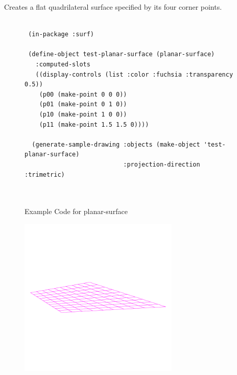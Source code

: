 \documentclass [11pt]{book}
\begin{document}
\begin{itemize}
\begin{description}
Creates a flat quadrilateral surface specified by its four corner points.



\end{description}




\begin{figure}
\begin{lrbox}{\boxedverb}
\begin{minipage}{\linewidth}
{\small

\begin{verbatim}

 (in-package :surf)

 (define-object test-planar-surface (planar-surface)
   :computed-slots
   ((display-controls (list :color :fuchsia :transparency 0.5))
    (p00 (make-point 0 0 0))
    (p01 (make-point 0 1 0))
    (p10 (make-point 1 0 0))
    (p11 (make-point 1.5 1.5 0))))

  (generate-sample-drawing :objects (make-object 'test-planar-surface)
                           :projection-direction :trimetric)



\end{verbatim}}
\end{minipage}
\end{lrbox}
\fbox{\usebox{\boxedverb}}

\caption{Example Code for planar-surface}

\label{fig:example-code-planar-surface}

\end{figure}

\begin{figure}
\begin{center}
\includegraphics[width=3in,height=3in]{../images/example-planar-surface.pdf}
\end{center}


\end{figure}
\end{itemize}
\end{document}
